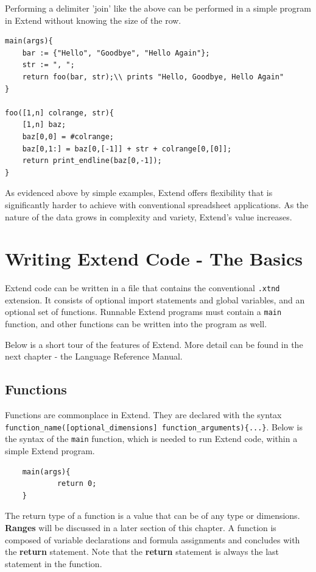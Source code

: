 \medskip \noindent Performing a delimiter 'join' like the above can be performed in a simple program in Extend without knowing the size of the row.

\begin{lstlisting}
main(args){
	bar := {"Hello", "Goodbye", "Hello Again"};
	str := ", ";
	return foo(bar, str);\\ prints "Hello, Goodbye, Hello Again"
}

foo([1,n] colrange, str){
	[1,n] baz;
	baz[0,0] = #colrange;
	baz[0,1:] = baz[0,[-1]] + str + colrange[0,[0]];
	return print_endline(baz[0,-1]);
}
\end{lstlisting}

\medskip \noindent As evidenced above by simple examples, Extend offers flexibility that is significantly harder to achieve with conventional spreadsheet applications. As the nature of the data grows in complexity and variety, Extend's value increases.

\section{Writing Extend Code - The Basics}
Extend code can be written in a file that contains the conventional \texttt{.xtnd} extension. It consists of optional import statements and global variables, and an optional set of functions. Runnable Extend programs must contain a \texttt{main} function, and other functions can be written into the program as well.

\medskip \noindent
Below is a short tour of the features of Extend. More detail can be found in the next chapter - the Language Reference Manual.

	\subsection{Functions}
	Functions are commonplace in Extend. They are declared with the syntax \texttt{function\_name([optional\_dimensions] function\_arguments)\{...\}}. Below is the syntax of the \texttt{main} function, which is needed to run Extend code, within a simple Extend program.

	\begin{lstlisting}
	main(args){
			return 0;
	}
	\end{lstlisting}

	\medskip \noindent
 	The return type of a function is a value that can be of any type or dimensions. \textbf{Ranges} will be discussed in a later section of this chapter. A function is composed of variable declarations and formula assignments and concludes with the \textbf{return} statement.
	Note that the \textbf{return} statement is always the last statement in the function.

